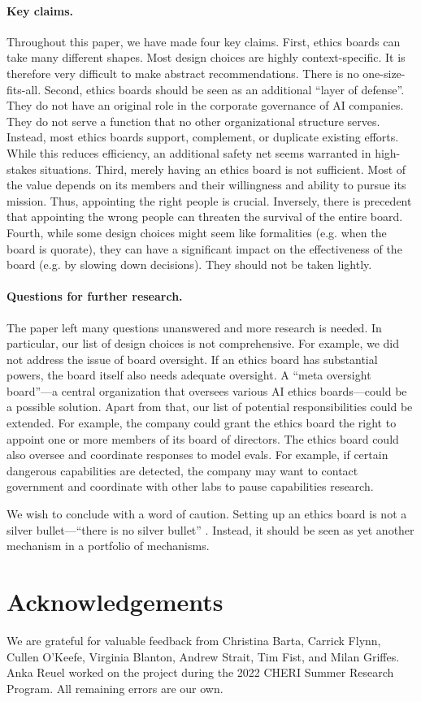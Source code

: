 \documentclass{article}
\begin{document}
\paragraph{Key claims.} Throughout this paper, we have made four key claims. First, ethics boards can take many different shapes. Most design choices are highly context-specific. It is therefore very difficult to make abstract recommendations. There is no one-size-fits-all. Second, ethics boards should be seen as an additional “layer of defense”. They do not have an original role in the corporate governance of AI companies. They do not serve a function that no other organizational structure serves. Instead, most ethics boards support, complement, or duplicate existing efforts. While this reduces efficiency, an additional safety net seems warranted in high-stakes situations. Third, merely having an ethics board is not sufficient. Most of the value depends on its members and their willingness and ability to pursue its mission. Thus, appointing the right people is crucial. Inversely, there is precedent that appointing the wrong people can threaten the survival of the entire board. Fourth, while some design choices might seem like formalities (e.g. when the board is quorate), they can have a significant impact on the effectiveness of the board (e.g. by slowing down decisions). They should not be taken lightly.

\paragraph{Questions for further research.} The paper left many questions unanswered and more research is needed. In particular, our list of design choices is not comprehensive. For example, we did not address the issue of board oversight. If an ethics board has substantial powers, the board itself also needs adequate oversight. A “meta oversight board”—a central organization that oversees various AI ethics boards—could be a possible solution. Apart from that, our list of potential responsibilities could be extended. For example, the company could grant the ethics board the right to appoint one or more members of its board of directors. The ethics board could also oversee and coordinate responses to model evals. For example, if certain dangerous capabilities are detected, the company may want to contact government and coordinate with other labs to pause capabilities research.

We wish to conclude with a word of caution. Setting up an ethics board is not a silver bullet—“there is no silver bullet” \cite{openai2022lessonslearned}. Instead, it should be seen as yet another mechanism in a portfolio of mechanisms.

\section*{Acknowledgements}

We are grateful for valuable feedback from Christina Barta, Carrick Flynn, Cullen O’Keefe, Virginia Blanton, Andrew Strait, Tim Fist, and Milan Griffes. Anka Reuel worked on the project during the 2022 CHERI Summer Research Program. All remaining errors are our own.



\end{document}
